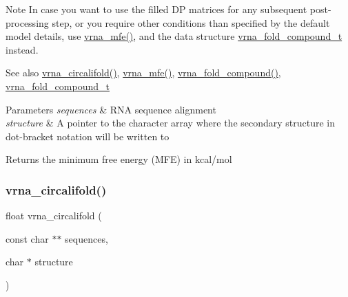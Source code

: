 \begin{DoxyNote}{Note}
In case you want to use the filled DP matrices for any subsequent post-\/processing step, or you require other conditions than specified by the default model details, use \hyperlink{group__mfe__fold_gabd3b147371ccf25c577f88bbbaf159fd}{vrna\+\_\+mfe()}, and the data structure \hyperlink{group__fold__compound_ga1b0cef17fd40466cef5968eaeeff6166}{vrna\+\_\+fold\+\_\+compound\+\_\+t} instead.
\end{DoxyNote}
\begin{DoxySeeAlso}{See also}
\hyperlink{group__consensus__mfe__fold_ga17a1be7490468c29c335ba9bffacba53}{vrna\+\_\+circalifold()}, \hyperlink{group__mfe__fold_gabd3b147371ccf25c577f88bbbaf159fd}{vrna\+\_\+mfe()}, \hyperlink{group__fold__compound_ga6601d994ba32b11511b36f68b08403be}{vrna\+\_\+fold\+\_\+compound()}, \hyperlink{group__fold__compound_ga1b0cef17fd40466cef5968eaeeff6166}{vrna\+\_\+fold\+\_\+compound\+\_\+t}
\end{DoxySeeAlso}

\begin{DoxyParams}{Parameters}
{\em sequences} & R\+NA sequence alignment \\
\hline
{\em structure} & A pointer to the character array where the secondary structure in dot-\/bracket notation will be written to \\
\hline
\end{DoxyParams}
\begin{DoxyReturn}{Returns}
the minimum free energy (M\+FE) in kcal/mol 
\end{DoxyReturn}
\mbox{\label{group__consensus__mfe__fold_ga17a1be7490468c29c335ba9bffacba53}} 
\subsubsection{\texorpdfstring{vrna\+\_\+circalifold()}{vrna\_circalifold()}}
{\footnotesize\ttfamily float vrna\+\_\+circalifold (\begin{DoxyParamCaption}\item[{const char $\ast$$\ast$}]{sequences,  }\item[{char $\ast$}]{structure }\end{DoxyParamCaption})}




